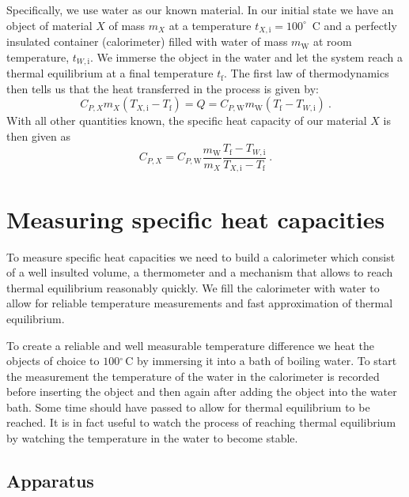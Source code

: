\documentclass[10pt,aps,twocolumn,secnumarabic,balancelastpage,amsmath,amssymb,nofootinbib,floatfix]{revtex4}
\newcommand{\C}{\ensuremath{^\circ\,\text{C}}}
\begin{document}
Specifically, we use water as our known material. In our initial state we have an object of material $X$ of mass $m_X$ at a temperature $t_{X,\text{i}} = 100^\circ$~C and a perfectly insulated container (calorimeter) filled with water of mass $m_\text{W}$ at room temperature, $t_{W,\text{i}}$. We immerse the object in the water and let the system reach a thermal equilibrium at a final temperature $t_\text{f}$. The first law of thermodynamics then tells us that the heat transferred in the process is given by:
\begin{equation}\label{eq:heat-transfered}
  C_{P,X} m_X  (T_{X,\text{i}} - T_\text{f}) = Q = C_{P,\text{W}} m_\text{W} (T_\text{f} - T_{W,\text{i}}) \ .
\end{equation}
With all other quantities known, the specific heat capacity of our material $X$ is then given as
\begin{equation}\label{eq:cpx}
  C_{P,X} = C_{P,\text{W}} \frac{m_\text{W}}{m_X} \frac{T_\text{f} - T_{W,\text{i}}}{T_{X,\text{i}} - T_\text{f}} \ .
\end{equation}
  
\section{Measuring specific heat capacities}

To measure specific heat capacities we need to build a calorimeter which consist of a well insulted volume, a thermometer and a mechanism that allows to reach thermal equilibrium reasonably quickly. We fill the calorimeter with water to allow for reliable temperature measurements and fast approximation of thermal equilibrium.

To create a reliable and well measurable temperature difference we heat the objects of choice to $100\C$ by immersing it into a bath of boiling water. To start the measurement the temperature of the water in the calorimeter is recorded before inserting the object and then again after adding the object into the water bath. Some time should have passed to allow for thermal equilibrium to be reached. It is in fact useful to watch the process of reaching thermal equilibrium by watching the temperature in the water to become stable.

\subsection{Apparatus}
\end{document}
